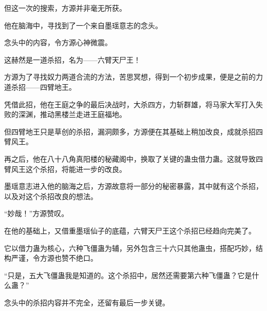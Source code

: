 \begin{this_body}
但这一次的搜索，方源并非毫无所获。

他在脑海中，寻找到了一个来自墨瑶意志的念头。

念头中的内容，令方源心神微震。

这赫然是一道杀招，名为——六臂天尸王！

方源为了寻找奴力两道合流的方法，苦思冥想，得到一个初步成果，便是之前的力道杀招——四臂地王。

凭借此招，他在王庭之争的最后决战时，大杀四方，力斩群雄，将马家大军打入失败的深渊，推动黑楼兰走进王庭福地。

但四臂地王只是草创的杀招，漏洞颇多，方源便在其基础上稍加改良，成就杀招四臂风王。

再之后，他在八十八角真阳楼的秘藏阁中，换取了关键的蛊虫借力蛊。这就导致四臂风王这个杀招，将能进一步的改良。

墨瑶意志进入他的脑海之后，方源故意将一部分的秘密暴露，其中就有这个杀招，以及对这个杀招改良的想法。

“妙哉！”方源赞叹。

在他的基础上，又借重墨瑶仙子的底蕴，六臂天尸王这个杀招已经趋向完美了。

它以借力蛊为核心，六种飞僵蛊为辅，另外包含三十六只其他蛊虫，搭配巧妙，结构严谨，令方源也赞不绝口。

“只是，五大飞僵蛊我是知道的。这个杀招中，居然还需要第六种飞僵蛊？它是什么蛊？”

念头中的杀招内容并不完全，还留有最后一步关键。

\end{this_body}

